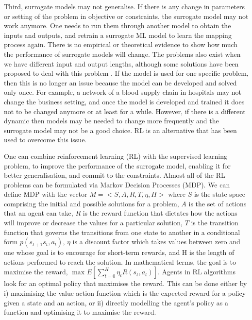 \documentclass[graybox]{svmult}
\begin{document}
Third, surrogate models may not generalise. If there is any change in parameters or setting of the problem in objective or constraints, the surrogate model may not work anymore. One needs to run them through another model to obtain the inputs and outputs, and retrain a surrogate ML model to learn the mapping process again. There is no empirical or theoretical evidence to show how much the performance of surrogate models will change. The problems also exist when we have different input and output lengths, although some solutions have been proposed to deal with this problem \cite{vinyals2015pointer}.
If the model is used for one specific problem, then this is no longer an issue because the model can be developed and solved only once. For example, a network of a blood supply chain in hospitals may not change the business setting, and once the model is developed and trained it does not to be changed anymore or at least for a while. However, if there is a different dynamic then models may be needed to change more frequently and the surrogate model may not be a good choice.  RL is an alternative that has been used to overcome this issue. 


One can combine reinforcement learning (RL) with the supervised learning problem, to improve the performance of the surrogate model, enabling it for better generalisation, and commit to the constraints. Almost all of the RL problems can be formulated via Markov Decision Processes (MDP). We can define MDP with the vector $M = <S,A,R, T, \eta,H>$ where $S$ is the state space comprising the initial and possible solutions for a problem, $A$ is the set of actions that an agent can take, $R$ is the reward function that dictates how the actions will improve or decrease the values for a particular solution, $T$ is the transition function that governs the transitions from one state to another in a conditional form $p(s_{t+1} s_t,a_t)$, $\eta$ is a discount factor which takes values between zero and one whose goal is to encourage for short-term rewards, and H is the length of actions performed to reach the solution. In mathematical terms, the goal is to maximise the reward, $\max_{}E[\sum_{t=0}^{H} \eta_t R(s_t, a_t)]$. Agents in RL algorithms look for an optimal policy that maximises the reward. This can be done either by i) maximising the value action function which is the expected reward for a policy given a state and an action, or ii) directly modelling the agent's policy as a function and optimising it to maximise the reward.

\end{document}
